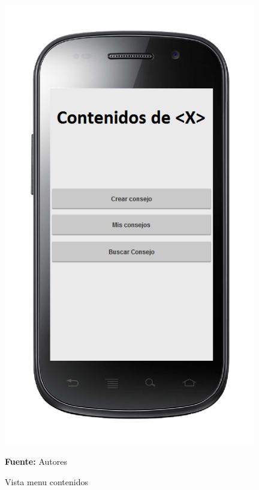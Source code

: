 \begin{figure}[!htb]
  \begin{center}
\includegraphics[width=11cm]{./imagenes/UI/Contenidos/menu_contenidos.png}
    \caption{Vista menu contenidos}
    \label{fig:Vista_menu_contenidos}
    \textbf{Fuente:}  Autores
  \end{center}
\end{figure}

